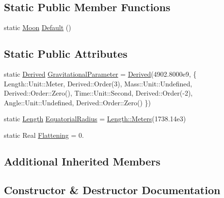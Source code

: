 \subsection*{Static Public Member Functions}
\begin{DoxyCompactItemize}
\item 
static \hyperlink{classlibrary_1_1physics_1_1env_1_1obj_1_1celest_1_1_moon}{Moon} \hyperlink{classlibrary_1_1physics_1_1env_1_1obj_1_1celest_1_1_moon_af9d3870d1a42118ea07d8c25b3c7da52}{Default} ()
\end{DoxyCompactItemize}
\subsection*{Static Public Attributes}
\begin{DoxyCompactItemize}
\item 
static \hyperlink{classlibrary_1_1physics_1_1units_1_1_derived}{Derived} \hyperlink{classlibrary_1_1physics_1_1env_1_1obj_1_1celest_1_1_moon_a3ef853ee9345bbad3e58d7f0a9d14030}{Gravitational\+Parameter} = \hyperlink{classlibrary_1_1physics_1_1units_1_1_derived}{Derived}(4902.\+8000e9, \{ Length\+::\+Unit\+::\+Meter, Derived\+::\+Order(3), Mass\+::\+Unit\+::\+Undefined, Derived\+::\+Order\+::\+Zero(), Time\+::\+Unit\+::\+Second, Derived\+::\+Order(-\/2), Angle\+::\+Unit\+::\+Undefined, Derived\+::\+Order\+::\+Zero() \})
\item 
static \hyperlink{classlibrary_1_1physics_1_1units_1_1_length}{Length} \hyperlink{classlibrary_1_1physics_1_1env_1_1obj_1_1celest_1_1_moon_a6b22597902ccee09be70ae4eecca2174}{Equatorial\+Radius} = \hyperlink{classlibrary_1_1physics_1_1units_1_1_length_ad523a3737d5c3f23a64588eac83f2148}{Length\+::\+Meters}(1738.\+14e3)
\item 
static Real \hyperlink{classlibrary_1_1physics_1_1env_1_1obj_1_1celest_1_1_moon_a02e660fcf1bf06697a037a354f698499}{Flattening} = 0.
\end{DoxyCompactItemize}
\subsection*{Additional Inherited Members}


\subsection{Constructor \& Destructor Documentation}
\mbox{\label{classlibrary_1_1physics_1_1env_1_1obj_1_1celest_1_1_moon_ad6b757c2ca0e9f9b6a733e3ee29e4f23}} 
